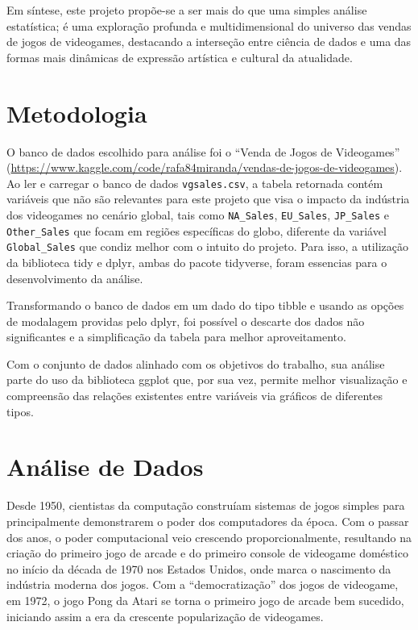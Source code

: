 \documentclass[draft]{agujournal2018}
\begin{document}
Em síntese, este projeto propõe-se a ser mais do que uma simples análise
estatística; é uma exploração profunda e multidimensional do universo
das vendas de jogos de videogames, destacando a interseção entre ciência
de dados e uma das formas mais dinâmicas de expressão artística e
cultural da atualidade.

\section{Metodologia}

O banco de dados escolhido para análise foi o ``Venda de Jogos de
Videogames''
(\url{https://www.kaggle.com/code/rafa84miranda/vendas-de-jogos-de-videogames}).
Ao ler e carregar o banco de dados \texttt{vgsales.csv}, a tabela
retornada contém variáveis que não são relevantes para este projeto que
visa o impacto da indústria dos videogames no cenário global, tais como
\texttt{NA\_Sales}, \texttt{EU\_Sales}, \texttt{JP\_Sales} e
\texttt{Other\_Sales} que focam em regiões específicas do globo,
diferente da variável \texttt{Global\_Sales} que condiz melhor com o
intuito do projeto. Para isso, a utilização da biblioteca tidy e dplyr,
ambas do pacote tidyverse, foram essencias para o desenvolvimento da
análise.

Transformando o banco de dados em um dado do tipo tibble e usando as
opções de modalagem providas pelo dplyr, foi possível o descarte dos
dados não significantes e a simplificação da tabela para melhor
aproveitamento.

Com o conjunto de dados alinhado com os objetivos do trabalho, sua
análise parte do uso da biblioteca ggplot que, por sua vez, permite
melhor visualização e compreensão das relações existentes entre
variáveis via gráficos de diferentes tipos.

\section{Análise de Dados}

Desde 1950, cientistas da computação construíam sistemas de jogos
simples para principalmente demonstrarem o poder dos computadores da
época. Com o passar dos anos, o poder computacional veio crescendo
proporcionalmente, resultando na criação do primeiro jogo de arcade e do
primeiro console de videogame doméstico no início da década de 1970 nos
Estados Unidos, onde marca o nascimento da indústria moderna dos jogos.
Com a ``democratização'' dos jogos de videogame, em 1972, o jogo Pong da
Atari se torna o primeiro jogo de arcade bem sucedido, iniciando assim a
era da crescente popularização de videogames.
\end{document}

